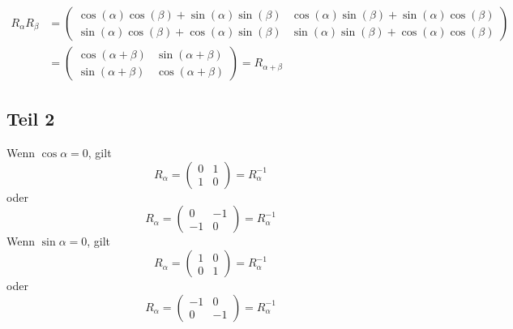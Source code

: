 \documentclass[a4paper,10pt]{article}
\begin{document}
\begin{align*}
 R_\alpha R_\beta & =
 \begin{pmatrix}
  \cos(\alpha)\cos(\beta) + \sin(\alpha)\sin(\beta) & \cos(\alpha)\sin(\beta) + \sin(\alpha)\cos(\beta)\\
  \sin(\alpha)\cos(\beta) + \cos(\alpha)\sin(\beta) & \sin(\alpha)\sin(\beta) + \cos(\alpha)\cos(\beta)
 \end{pmatrix}\\
 & =
 \begin{pmatrix}
  \cos(\alpha + \beta) & \sin(\alpha + \beta)\\
  \sin(\alpha + \beta) & \cos(\alpha + \beta)
 \end{pmatrix}
 = R_{\alpha + \beta}
\end{align*}

\subsection*{Teil 2}

Wenn $\cos \alpha = 0$, gilt
\begin{equation}
 R_\alpha =
 \begin{pmatrix}
  0 & 1\\
  1 & 0
 \end{pmatrix} = R_\alpha^{-1}
\end{equation}
oder
\begin{equation}
 R_\alpha =
 \begin{pmatrix}
  0 & -1\\
  -1 & 0
 \end{pmatrix} = R_\alpha^{-1}
\end{equation}
Wenn $\sin \alpha = 0$, gilt
\begin{equation}
 R_\alpha =
 \begin{pmatrix}
  1 & 0\\
  0 & 1
 \end{pmatrix} = R_\alpha^{-1}
\end{equation}
oder
\begin{equation}
 R_\alpha =
 \begin{pmatrix}
  -1 & 0\\
  0 & -1
 \end{pmatrix} = R_\alpha^{-1}
\end{equation}
\end{document}
